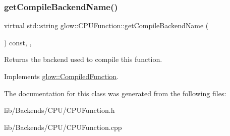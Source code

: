 \subsubsection{\texorpdfstring{get\+Compile\+Backend\+Name()}{getCompileBackendName()}}
{\footnotesize\ttfamily virtual std\+::string glow\+::\+C\+P\+U\+Function\+::get\+Compile\+Backend\+Name (\begin{DoxyParamCaption}{ }\end{DoxyParamCaption}) const\hspace{0.3cm}{\ttfamily [inline]}, {\ttfamily [override]}, {\ttfamily [virtual]}}

\begin{DoxyReturn}{Returns}
the backend used to compile this function. 
\end{DoxyReturn}


Implements \hyperlink{classglow_1_1_compiled_function_a7b3f2b17986d14706a1d1091d3c4df27}{glow\+::\+Compiled\+Function}.



The documentation for this class was generated from the following files\+:\begin{DoxyCompactItemize}
\item 
lib/\+Backends/\+C\+P\+U/C\+P\+U\+Function.\+h\item 
lib/\+Backends/\+C\+P\+U/C\+P\+U\+Function.\+cpp\end{DoxyCompactItemize}
